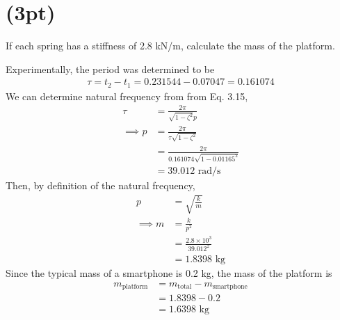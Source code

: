 \section{(3pt)}
If each spring has a stiffness of 2.8 kN/m, calculate the mass of the platform.

Experimentally, the period was determined to be 
\begin{align*}
    \tau = t_2 - t_1 = 0.231544 - 0.07047 = 0.161074
\end{align*}
We can determine natural frequency from from Eq. 3.15, 
\begin{align*}
    \tau &= \frac{2\pi}{\sqrt{1-\zeta^2} p} \\
    \implies p &= \frac{2\pi}{\tau\sqrt{1-\zeta^2}} \\
    &= \frac{2\pi}{0.161074\sqrt{1-0.01165^2}} \\
    &= 39.012 \text{ rad/s}
\end{align*}
Then, by definition of the natural frequency,
\begin{align*}
    p &= \sqrt{\frac{k}{m}} \\
    \implies m &= \frac{k}{p^2} \\
    &= \frac{2.8\times 10^3}{39.012^2} \\
    &= 1.8398 \text{ kg}
\end{align*}
Since the typical mass of a smartphone is 0.2 kg, the mass of the platform is 
\begin{align*}
   m_{\text{platform}} &= m_{\text{total}} - m_{\text{smartphone}} \\
    &= 1.8398 - 0.2 \\
    &= \boxed{1.6398 \text{ kg}}
\end{align*}